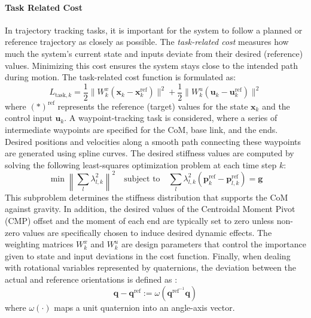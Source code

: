 \documentclass[main.tex]{subfiles}
\begin{document}
\begin{sloppypar}
\paragraph{Task Related Cost}
In trajectory tracking tasks, it is important for the system to follow a planned or reference trajectory as closely as possible. The \textit{task-related cost} measures how much the system's current state and inputs deviate from their desired (reference) values. Minimizing this cost ensures the system stays close to the intended path during motion. The task-related cost function is formulated as:
\begin{equation}
L_{\text{task},k} = \frac{1}{2} \| W^x_k (\mathbf{x}_k - \mathbf{x}^{\text{ref}}_k) \|^2 + \frac{1}{2} \| W^u_k (\mathbf{u}_k - \mathbf{u}^{\text{ref}}_k) \|^2
\end{equation}
where $(\ast)^{\text{ref}}$ represents the reference (target) values for the state $\mathbf{x}_k$ and the control input $\mathbf{u}_k$. A waypoint-tracking task is considered, where a series of intermediate waypoints are specified for the CoM, base link, and the ends. Desired positions and velocities along a smooth path connecting these waypoints are generated using spline curves. The desired stiffness values are computed by solving the following least-squares optimization problem at each time step $k$:
\begin{equation}
\min \left\| \sum_l \lambda_{l,k}^2 \right\|^2 \quad \text{subject to} \quad \sum_l \lambda_{l,k}^2 (\mathbf{p}^{\text{ref}}_k - \mathbf{p}^{\text{ref}}_{l,k}) = \mathbf{g}
\end{equation}
This subproblem determines the stiffness distribution that supports the CoM against gravity. In addition, the desired values of the Centroidal Moment Pivot (CMP) offset and the moment of each end are typically set to zero unless non-zero values are specifically chosen to induce desired dynamic effects. The weighting matrices $W^x_k$ and $W^u_k$ are design parameters that control the importance given to state and input deviations in the cost function. Finally, when dealing with rotational variables represented by quaternions, the deviation between the actual and reference orientations is defined as :
\begin{equation}
\mathbf{q} - \mathbf{q}^{\text{ref}} := \omega(\mathbf{q}^{\text{ref}^{-1}} \mathbf{q})
\end{equation}
where $\omega(\cdot)$ maps a unit quaternion into an angle-axis vector.

\end{sloppypar}
\end{document}
